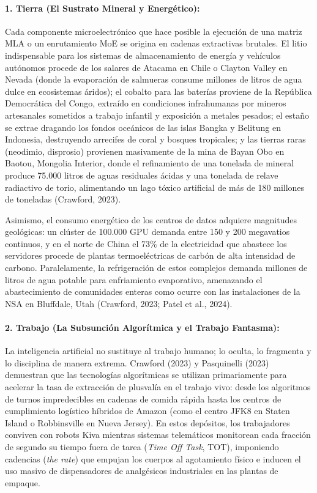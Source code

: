 \paragraph{1. Tierra (El Sustrato Mineral y Energético):}
Cada componente microelectrónico que hace posible la ejecución de una matriz MLA o un enrutamiento MoE se origina en cadenas extractivas brutales. El litio indispensable para los sistemas de almacenamiento de energía y vehículos autónomos procede de los salares de Atacama en Chile o Clayton Valley en Nevada (donde la evaporación de salmueras consume millones de litros de agua dulce en ecosistemas áridos); el cobalto para las baterías proviene de la República Democrática del Congo, extraído en condiciones infrahumanas por mineros artesanales sometidos a trabajo infantil y exposición a metales pesados; el estaño se extrae dragando los fondos oceánicos de las islas Bangka y Belitung en Indonesia, destruyendo arrecifes de coral y bosques tropicales; y las tierras raras (neodimio, disprosio) provienen masivamente de la mina de Bayan Obo en Baotou, Mongolia Interior, donde el refinamiento de una tonelada de mineral produce 75.000 litros de aguas residuales ácidas y una tonelada de relave radiactivo de torio, alimentando un lago tóxico artificial de más de 180 millones de toneladas (Crawford, 2023).

Asimismo, el consumo energético de los centros de datos adquiere magnitudes geológicas: un clúster de 100.000 GPU demanda entre 150 y 200 megavatios continuos, y en el norte de China el 73\% de la electricidad que abastece los servidores procede de plantas termoeléctricas de carbón de alta intensidad de carbono. Paralelamente, la refrigeración de estos complejos demanda millones de litros de agua potable para enfriamiento evaporativo, amenazando el abastecimiento de comunidades enteras como ocurre con las instalaciones de la NSA en Bluffdale, Utah (Crawford, 2023; Patel et al., 2024).

\paragraph{2. Trabajo (La Subsunción Algorítmica y el Trabajo Fantasma):}
La inteligencia artificial no sustituye al trabajo humano; lo oculta, lo fragmenta y lo disciplina de manera extrema. Crawford (2023) y Pasquinelli (2023) demuestran que las tecnologías algorítmicas se utilizan primariamente para acelerar la tasa de extracción de plusvalía en el trabajo vivo: desde los algoritmos de turnos impredecibles en cadenas de comida rápida hasta los centros de cumplimiento logístico híbridos de Amazon (como el centro JFK8 en Staten Island o Robbinsville en Nueva Jersey). En estos depósitos, los trabajadores conviven con robots Kiva mientras sistemas telemáticos monitorean cada fracción de segundo su tiempo fuera de tarea (\textit{Time Off Task}, TOT), imponiendo cadencias (\textit{the rate}) que empujan los cuerpos al agotamiento físico e inducen el uso masivo de dispensadores de analgésicos industriales en las plantas de empaque.

